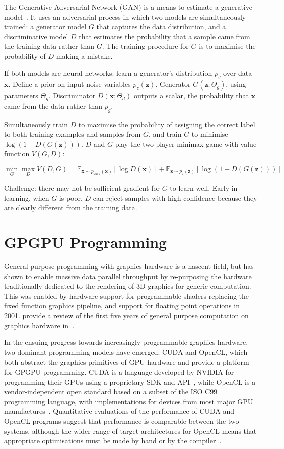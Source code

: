 The Generative Adversarial Network (GAN) is a means to estimate a generative model~\cite{Goodfellow2014}. It uses an adversarial process in which two models are simultaneously trained: a generator model $G$ that captures the data distribution, and a discriminative model $D$ that estimates the probability that a sample came from the training data rather than $G$. The training procedure for $G$ is to maximise the probability of $D$ making a mistake.

If both models are neural networks: learn a generator's distribution $p_g$ over data $\bm{x}$. Define a prior on input noise variables $p_z(\bm{z})$. Generator $G(\bm{z}; \Theta_g)$, using parameters $\Theta_g$. Discriminator $D(\bm{x}; \Theta_d)$ outputs a scalar, the probability that $\bm{x}$ came from the data rather than $p_g$. 

Simultaneously train $D$ to maximise the probability of assigning the correct label to both training examples and samples from $G$, and train $G$ to minimise $\log (1 - D(G(\bm{z})))$. $D$ and $G$ play the two-player minimax game with value function $V(G, D)$:

\[ \min_G \max_D V(D, G) = \mathbb{E}_{\bm{x} \sim  p_{data}(\bm{x})} [ \log D(\bm{x}) ] + \mathbb{E}_{\bm{z} \sim p_z(\bm{z})} [ \log (1 - D(G(\bm{z}))) ] \]

Challenge: there may not be sufficient gradient for $G$ to learn well. Early in learning, when $G$ is poor, $D$ can reject samples with high confidence because they are clearly different from the training data.


\section{GPGPU Programming}
\label{subsec:background-gpgpu}

General purpose programming with graphics hardware is a nascent field, but has shown to enable massive data parallel throughput by re-purposing the hardware traditionally dedicated to the rendering of 3D graphics for generic computation. This was enabled by hardware support for programmable shaders replacing the fixed function graphics pipeline, and support for floating point operations in 2001. \citeauthor{Owens2006} provide a review of the first five years of general purpose computation on graphics hardware in~\cite{Owens2006}.

In the ensuing progress towards increasingly programmable graphics hardware, two dominant programming models have emerged: CUDA and OpenCL, which both abstract the graphics primitives of GPU hardware and provide a platform for GPGPU programming. CUDA is a language developed by NVIDIA for programming their GPUs using a proprietary SDK and API~\cite{Nvidia2007}, while OpenCL is a vendor-independent open standard based on a subset of the ISO C99 programming language, with implementations for devices from most major GPU manufactures~\cite{Stone2010}. Quantitative evaluations of the performance of CUDA and OpenCL programs suggest that performance is comparable between the two systems, although the wider range of target architectures for OpenCL means that appropriate optimisations must be made by hand or by the compiler~\cite{Komatsu2010,Karimi2010}.


